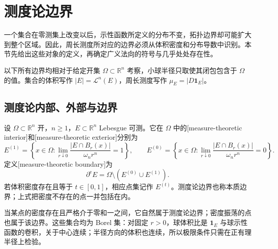 
% 
% 

\section{测度论边界}
\label{g3:sec:2103}

一个集合在零测集上改变以后，示性函数所定义的分布不变，拓扑边界却可能扩大到整个区域。因此，周长测度所对应的边界必须从体积密度和分布导数中识别。本节先给出这些对象的定义，再确定广义法向的符号与几乎处处存在性。

\ProseParagraphBreak
以下所有边界均相对于给定开集 \(\Omega\subset\mathbb R^n\) 考察，小球半径只取使其闭包包含于 \(\Omega\) 的值。集合的体积写作 \(|E|=\mathcal L^n(E)\)，周长测度写作 \(\mu_E=|D\mathbf1_E|\)。

\subsection{测度论内部、外部与边界}
\label{g3:subsec:2103:01}
\begin{definition}\label{g3:def:measure-theoretic-boundary}
	设 \(\Omega\subset\mathbb R^n\) 开，\(n\ge1\)，\(E\subset\mathbb R^n\) Lebesgue 可测。它在 \(\Omega\) 中的[measure-theoretic interior]和[measure-theoretic exterior]分别为
	\[
		E^{(1)}=\left\{x\in\Omega:
		\lim_{r\downarrow0}\frac{|E\cap B_r(x)|}{\omega_nr^n}=1\right\},
		\qquad
		E^{(0)}=\left\{x\in\Omega:
		\lim_{r\downarrow0}\frac{|E\cap B_r(x)|}{\omega_nr^n}=0\right\}.
	\]
	定义[measure-theoretic boundary]为
	\[
		\partial^{\mathrm e}E
		=\Omega\setminus(E^{(0)}\cup E^{(1)}).
	\]
	若体积密度存在且等于 \(t\in[0,1]\)，相应点集记作 \(E^{(t)}\)。测度论边界也称本质边界；上式把密度不存在的点一并包括在内。
\end{definition}

当某点的密度存在且严格介于零和一之间，它自然属于测度论边界；密度振荡的点也属于该边界。这些集合均为 Borel 集：对固定 \(r>0\)，球体积比是 \(\mathbf1_E\) 与球示性函数的卷积，关于中心连续；半径方向的体积也连续，所以极限条件只需在正有理半径上检验。

